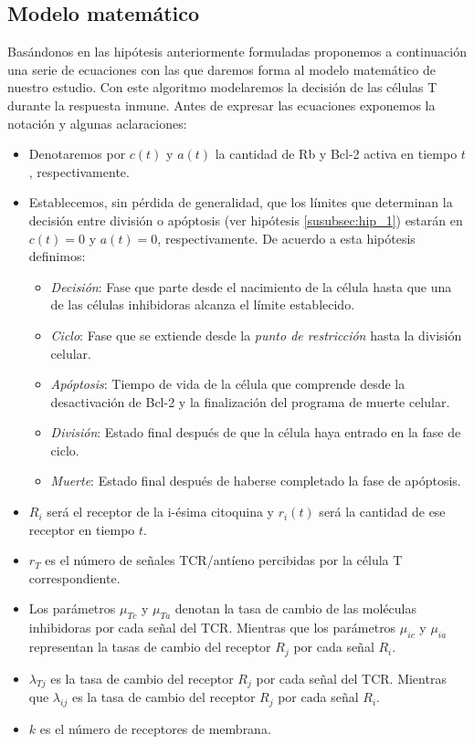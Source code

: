 \subsection{Modelo matemático}
\label{sub:modelo}

Basándonos en las hipótesis anteriormente formuladas proponemos a continuación una serie de ecuaciones con las que daremos forma al modelo matemático de nuestro estudio. Con este algoritmo modelaremos la decisión de las células T durante la respuesta inmune. 
Antes de expresar las ecuaciones exponemos la notación y algunas aclaraciones: 

\begin{itemize}
\item Denotaremos por \textit{$c(t)$} y \textit{$a(t)$} la cantidad de Rb y Bcl-2 activa en tiempo $t$, respectivamente.
\item Establecemos, sin pérdida de generalidad, que los límites que determinan la decisión entre división o apóptosis (ver hipótesis \ref{susubsec:hip_1}) estarán en $c(t)=0$ y $a(t)=0$, respectivamente. De acuerdo a esta hipótesis definimos: 
	\begin{itemize}
		\item \textit{Decisión}: Fase que parte desde el nacimiento de la célula hasta que una de las células inhibidoras alcanza el límite establecido.
		\item \textit{Ciclo}: Fase que se extiende desde la \textit{punto de restricción} hasta la división celular.
		\item \textit{Apóptosis}: Tiempo de vida de la célula que comprende desde la desactivación de Bcl-2 y la finalización del programa de muerte celular.
		\item \textit{División}: Estado final después de que la célula haya entrado en la fase de ciclo.
		\item \textit{Muerte}: Estado final después de haberse completado la fase de apóptosis.
	\end{itemize}
\item \textit{$R_{i}$} será el receptor de la i-ésima citoquina y \textit{$r_{i}(t)$} será la cantidad de ese receptor en tiempo $t$. 
\item $r_{T}$ es el número de señales TCR/antíeno  percibidas por la célula T correspondiente.
\item Los parámetros $\mu_{Tc}$ y $\mu_{Ta}$ denotan la tasa de cambio de las moléculas inhibidoras por cada señal del TCR. Mientras que los parámetros $\mu_{ic}$ y $\mu_{ia}$ representan la tasas de cambio del receptor $R_j$ por cada señal $R_i$.
\item $\lambda_{Tj}$ es la tasa de cambio del receptor $R_{j}$ por cada señal del TCR. Mientras que $\lambda_{ij}$ es la tasa de cambio del receptor $R_j$ por cada señal $R_i$.
\item $k$ es el número de receptores de membrana.
\end{itemize} 

